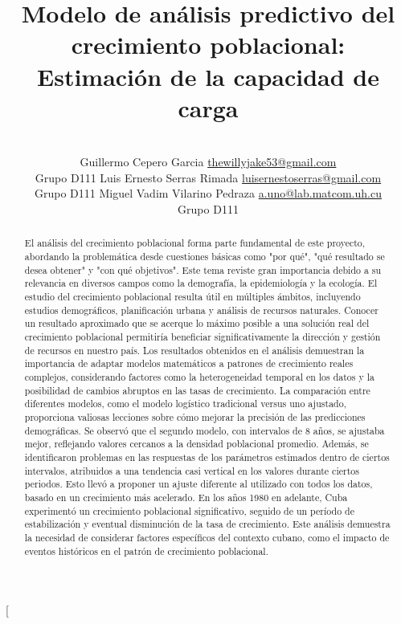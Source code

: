 \documentclass[a4paper,10pt,twocolumn]{article}
\title{Modelo de análisis predictivo del crecimiento poblacional: Estimación de la capacidad de carga}
\author{\\
\name Guillermo Cepero Garcia \email \href{mailto:thewillyjake53@gmail.com}{thewillyjake53@gmail.com}
	\\ \addr Grupo D111 \AND
\name Luis Ernesto Serras Rimada \email \href{mailto:luisernestoserras@gmail.com}{luisernestoserras@gmail.com}
  \\ \addr Grupo D111 \AND
\name Miguel Vadim Vilarino Pedraza \email \href{mailto:a.uno@lab.matcom.uh.cu}{a.uno@lab.matcom.uh.cu}
	\\ \addr Grupo D111}
\begin{document}
\twocolumn[

\maketitle


\begin{abstract}

	El análisis del crecimiento poblacional forma parte fundamental de este proyecto, abordando la problemática desde cuestiones básicas como "por qué", "qué resultado se desea obtener" y "con qué objetivos". 
	Este tema reviste gran importancia debido a su relevancia en diversos campos como la demografía, la epidemiología y la ecología. El estudio del crecimiento poblacional resulta útil en múltiples ámbitos, incluyendo estudios demográficos, planificación urbana y análisis de recursos naturales. Conocer un resultado aproximado que se acerque lo máximo posible a una solución real del crecimiento poblacional permitiría beneficiar significativamente la dirección y gestión de recursos en nuestro país. Los resultados obtenidos en el análisis demuestran la importancia de adaptar modelos matemáticos a patrones de crecimiento reales complejos, considerando factores como la heterogeneidad temporal en los datos y la posibilidad de cambios abruptos en las tasas de crecimiento. La comparación entre diferentes modelos, como el modelo logístico tradicional versus uno ajustado, proporciona valiosas lecciones sobre cómo mejorar la precisión de las predicciones demográficas. Se observó que el segundo modelo, con intervalos de 8 años, se ajustaba mejor, reflejando valores cercanos a la densidad poblacional promedio. Además, se identificaron problemas en las respuestas de los parámetros estimados dentro de ciertos intervalos, atribuidos a una tendencia casi vertical en los valores durante ciertos periodos. Esto llevó a proponer un ajuste diferente al utilizado con todos los datos, basado en un crecimiento más acelerado. En los años 1980 en adelante, Cuba experimentó un crecimiento poblacional significativo, seguido de un período de estabilización y eventual disminución de la tasa de crecimiento. Este análisis demuestra la necesidad de considerar factores específicos del contexto cubano, como el impacto de eventos históricos en el patrón de crecimiento poblacional.

\end{abstract}
\end{document}
